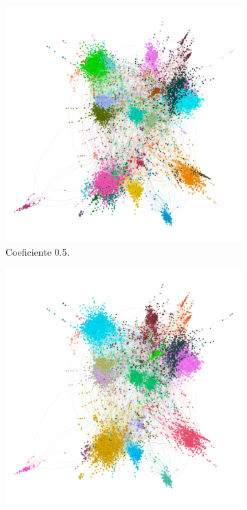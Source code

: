 \begin{figure}
    \centering  
    \begin{subfigure}[t]{0.48\textwidth}
      \centering
      \includegraphics[width=\textwidth]{img/resultados/grado-lovaina0.5.png}
      \caption{Coeficiente 0.5.}
    \end{subfigure}
    \vspace{7mm}
    \hfill
    \begin{subfigure}[t]{0.48\textwidth}
      \centering
      \includegraphics[width=\textwidth]{img/resultados/grado-lovaina1.png}

\end{subfigure}
\end{figure}
